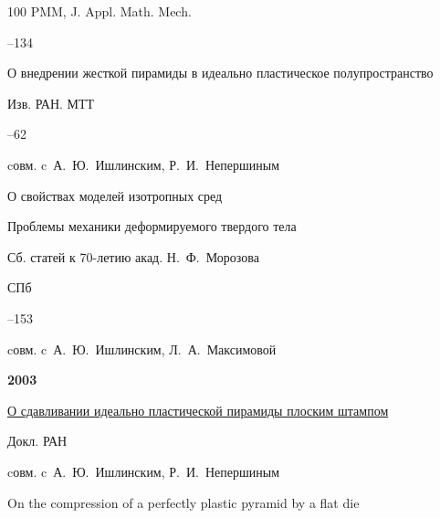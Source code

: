 \begin{thebibliography}{100}
\jour PMM, J. Appl. Math. Mech. 



--134 








\paper О внедрении жесткой пирамиды в идеально пластическое полупространство 

\jour Изв. РАН. МТТ



–62 

\miscnote cовм. c~А.~Ю.~Ишлинским, Р.~И.~Непершиным






\paper О свойствах моделей изотропных сред 

\inbook Проблемы механики деформируемого твердого тела

\bookinfo Сб. статей к 70-летию акад. Н.~Ф.~Морозова

\publaddr СПб


–153

\miscnote cовм. c~А.~Ю.~Ишлинским, Л.~А.~Максимовой



\item[] \centerline{\bf 2003}




\paper \href{http://elibrary.ru/item.asp?id=17344657}{О сдавливании идеально пластической пирамиды плоским штампом}

\jour Докл. РАН







\miscnote cовм. c~А.~Ю.~Ишлинским, Р.~И.~Непершиным

\transl

\paper On the compression of a perfectly plastic pyramid by a flat die


\end{thebibliography}
